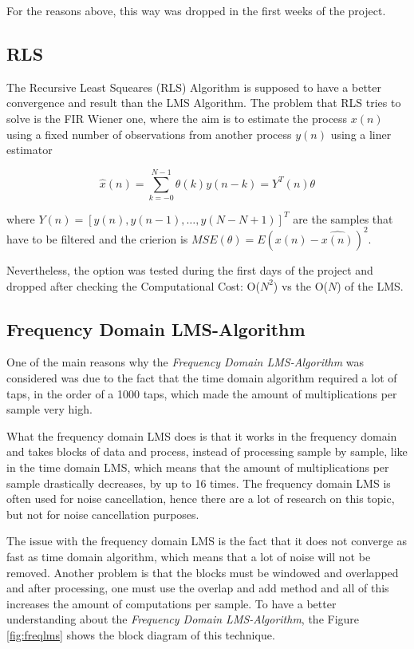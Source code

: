 \documentclass[11pt,a4paper,english]{book}  %
\theoremstyle{definition}  %
\theoremstyle{plain}  %
\theoremstyle{remark}  %
\begin{document}
	For the reasons above, this way was dropped in the first weeks of the project.
	
	\subsection{RLS}
	
	The Recursive Least Squeares (RLS) Algorithm \cite{asp} is supposed to have a better convergence and result than the LMS Algorithm. The problem that RLS tries to solve is the FIR Wiener one, where the aim is to estimate the process $x(n)$ using a fixed number of observations from another process ${y(n)}$ using a liner estimator
	
	\begin{equation}
	\hat{x}(n)=\sum \limits_{k=-0}^{N-1} \theta(k)y(n-k)=Y^T (n)\theta
	\end{equation}
	
	where $Y(n)= [y(n),y(n-1),\dots,y(N-N+1)]^T$ are the samples that have to be filtered and the crierion is $MSE(\theta)=E{(x(n)-\hat{x(n)})^2}$.
	
	Nevertheless, the option was tested during the first days of the project and dropped after checking the Computational Cost: O($N^2$) vs the  O($N$) of the LMS.
	
	
	\subsection{Frequency Domain LMS-Algorithm}
	
	One of the main reasons why the \textit{Frequency Domain LMS-Algorithm} was considered was due to the fact that the time domain algorithm required a lot of taps, in the order of a 1000 taps, which made the amount of multiplications per sample very high. 
	
What the frequency domain LMS does is that it works in the frequency domain and takes blocks of data and process, instead of processing sample by sample, like in the time domain LMS, which means that the amount of multiplications per sample drastically decreases, by up to 16 times. The frequency domain LMS is often used for noise cancellation, hence there are a lot of research on this topic, but not for noise cancellation purposes.

The issue with the frequency domain LMS is the fact that it does not converge as fast as time domain algorithm, which means that a lot of noise will not be removed. Another problem is that the blocks must be windowed and overlapped and after processing, one must use the overlap and add method and all of this increases the amount of computations per sample. To have a better understanding about the \textit{Frequency Domain LMS-Algorithm}, the Figure \ref{fig:freqlms} shows the block diagram of this technique.
\end{document}
